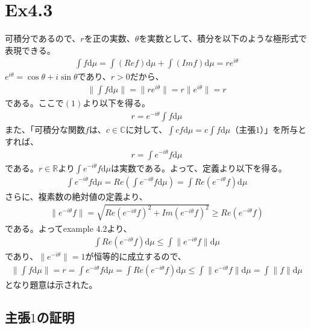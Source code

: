 \documentclass{article}
\begin{document}
\section{Ex4.3}
可積分であるので、$r$を正の実数、$\theta$を実数として、積分を以下のような極形式で表現できる。
\begin{align}
	\int f\mathrm{d}\mu = \int (Re f) \mathrm{d}\mu + \int (Im f) \mathrm{d}\mu = r e^{i\theta}
\end{align}
$e^{i\theta} = \cos \theta + i \sin\theta$であり、$r > 0$だから、
\begin{align*}
	\| \int f\mathrm{d}\mu \| = \| re^{i\theta} \| = r\| e^{i\theta} \| = r
\end{align*}
である。ここで$(1)$より以下を得る。
\begin{align*}
	r = e^{-i\theta} \int f\mathrm{d}\mu
\end{align*}
また、「可積分な関数$f$は、$c \in \mathbb{C}$に対して、$\int cf \mathrm{d}\mu = c \int f \mathrm{d}\mu$（主張$1$）」を所与とすれば、
\begin{align*}
	r = \int e^{-i\theta} f\mathrm{d}\mu
\end{align*}
である。$r\in \mathbb{R}$より$\int e^{-i\theta} f\mathrm{d}\mu$は実数である。よって、定義より以下を得る。
\begin{align*}
	\int e^{-i\theta} f\mathrm{d}\mu = Re\left( \int e^{-i\theta} f\mathrm{d}\mu \right) = \int Re\left( e^{-i\theta} f\right) \mathrm{d}\mu
\end{align*}
さらに、複素数の絶対値の定義より、
\begin{align*}
	\| e^{-i\theta} f \| = \sqrt{ Re\left( e^{-i\theta} f\right)^2 + Im\left( e^{-i\theta} f\right)^2 } \geq Re\left( e^{-i\theta} f\right)
\end{align*}
である。よってexample 4.2より、
\begin{align*}
	\int Re\left( e^{-i\theta} f\right) \mathrm{d}\mu \leq \int \| e^{-i\theta} f\| \mathrm{d}\mu
\end{align*}
であり、$\| e^{-i\theta} \| = 1$が恒等的に成立するので、
\begin{align*}
	\| \int f\mathrm{d}\mu \| = r = \int e^{-i\theta} f\mathrm{d}\mu = \int Re\left( e^{-i\theta} f\right) \mathrm{d}\mu \leq \int \| e^{-i\theta} f\| \mathrm{d}\mu = \int \| f \| \mathrm{d}\mu 
\end{align*}
となり題意は示された。

\subsection{主張$1$の証明}
\end{document}
